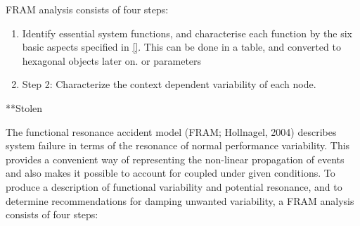 FRAM analysis consists of four steps:

\begin{enumerate}
  \item Identify essential system functions, and characterise each function by the six basic aspects specified in \ref{}. This can be done in a table, and converted to hexagonal objects later on.
or parameters
  \item Step 2: Characterize the context dependent variability of each node.
\end{enumerate}
**Stolen






The functional resonance accident model (FRAM; Hollnagel, 2004) describes system failure in terms of the resonance of normal performance variability. This provides a convenient way
of representing the non-linear propagation of events and also makes it possible to account for
coupled under given conditions. To produce a description of functional variability and
potential resonance, and to determine recommendations for damping unwanted variability, a
FRAM analysis consists of four steps:


